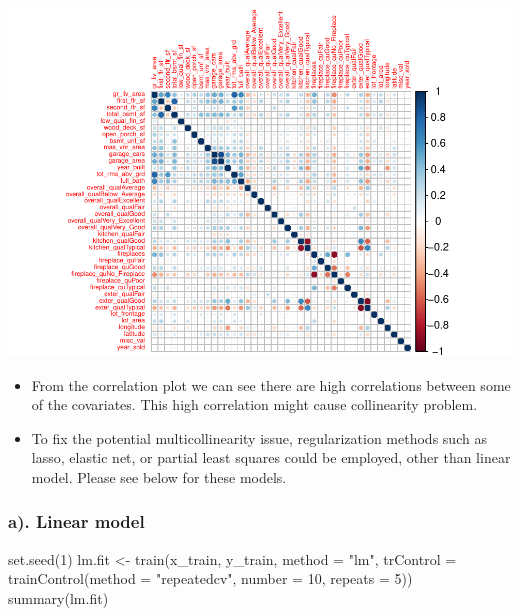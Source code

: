 \documentclass[
]{article}
\newenvironment{Shaded}{\begin{snugshade}}{\end{snugshade}}
\newcommand{\AttributeTok}[1]{\textcolor[rgb]{0.77,0.63,0.00}{#1}}
\newcommand{\DecValTok}[1]{\textcolor[rgb]{0.00,0.00,0.81}{#1}}
\newcommand{\FunctionTok}[1]{\textcolor[rgb]{0.00,0.00,0.00}{#1}}
\newcommand{\NormalTok}[1]{#1}
\newcommand{\OtherTok}[1]{\textcolor[rgb]{0.56,0.35,0.01}{#1}}
\newcommand{\StringTok}[1]{\textcolor[rgb]{0.31,0.60,0.02}{#1}}
\begin{document}
\includegraphics{p8106_hw1_qz2266_final_files/figure-latex/correlation plot-1.pdf}

\begin{itemize}
\item
  From the correlation plot we can see there are high correlations
  between some of the covariates. This high correlation might cause
  collinearity problem.
\item
  To fix the potential multicollinearity issue, regularization methods
  such as lasso, elastic net, or partial least squares could be
  employed, other than linear model. Please see below for these models.
\end{itemize}

\hypertarget{a.-linear-model}{%
\subsubsection{a). Linear model}\label{a.-linear-model}}

\begin{Shaded}
\begin{Highlighting}[]
\FunctionTok{set.seed}\NormalTok{(}\DecValTok{1}\NormalTok{)}
\NormalTok{lm.fit }\OtherTok{\textless{}{-}} \FunctionTok{train}\NormalTok{(x\_train, y\_train, }
             \AttributeTok{method =} \StringTok{"lm"}\NormalTok{,}
             \AttributeTok{trControl =} \FunctionTok{trainControl}\NormalTok{(}\AttributeTok{method =} \StringTok{"repeatedcv"}\NormalTok{, }\AttributeTok{number =} \DecValTok{10}\NormalTok{, }\AttributeTok{repeats =} \DecValTok{5}\NormalTok{))}
\FunctionTok{summary}\NormalTok{(lm.fit)}
\end{Highlighting}
\end{Shaded}
\end{document}
